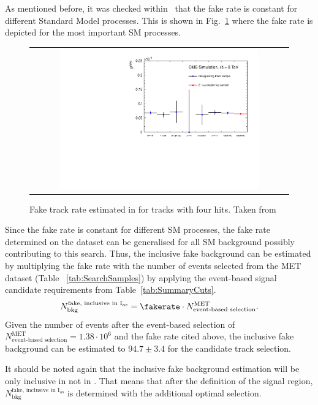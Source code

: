 As mentioned before, it was checked within~\cite{bib:CMS:DT_Thesis,bib:CMS:DT_8TeV_AN} that the fake rate is constant for different Standard Model processes.
This is shown in Fig.~\ref{fig:FakeRate} where the fake rate is depicted for the most important SM processes.
\begin{figure}[!b]
  \centering 
  \begin{tabular}{c}
    \includegraphics[width=0.79\textwidth]{figures/analysis/Background/fakeTrkRates.pdf}
  \end{tabular}
  \caption{Fake track rate estimated in \cite{bib:CMS:DT_Thesis,bib:CMS:DT_8TeV_AN} for tracks with four hits. Taken from \cite{bib:CMS:DT_8TeV_AN} }
  \label{fig:FakeRate}
\end{figure}
Since the fake rate is constant for different SM processes, the fake rate determined on the \Zlep dataset can be generalised for all SM background possibly contributing to this search.
Thus, the inclusive fake background can be estimated by multiplying the fake rate with the number of events selected from the MET dataset (Table ~\ref{tab:SearchSamples}) by applying the event-based signal candidate requirements from Table~\ref{tab:SummaryCuts}.
\begin{equation*}
N^{\text{fake, inclusive in I$_{\text{as}}$}}_{\text{bkg}} = \fakerate \cdot N_{\text{event-based selection}}^{\text{MET}}.
\end{equation*}
Given the number of events after the event-based selection of $N_{\text{event-based selection}}^{\text{MET}} = 1.38\cdot10^6$ and the fake rate cited above, 
the inclusive fake background can be estimated to $94.7\pm3.4$ for the candidate track selection.

It should be noted again that the inclusive fake background estimation will be only inclusive in \ias not in \pt.
That means that after the definition of the signal region, $N^{\text{fake, inclusive in I$_{\text{as}}$}}_{\text{bkg}}$ is determined with the additional optimal \pt selection.

